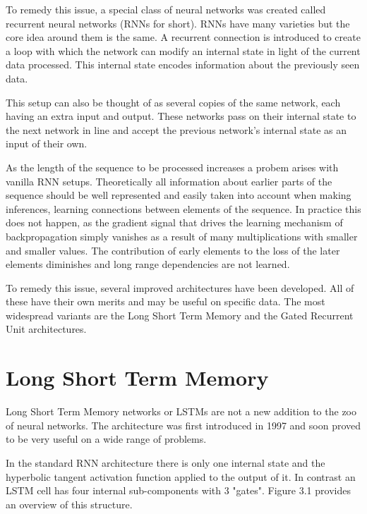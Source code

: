 \documentclass[bsc,frontabs,singlespacing,parskip,deptreport]{infthesis}
\begin{document}
To remedy this issue, a special class of neural networks was created called recurrent neural networks (RNNs for short). RNNs have many varieties but the core idea around them is the same. A recurrent connection is introduced to create a loop with which the network can modify an internal state in light of the current data processed. This internal state encodes information about the previously seen data. 

This setup can also be thought of as several copies of the same network, each having an extra input and output. These networks pass on their internal state to the next network in line and accept the previous network's internal state as an input of their own.

As the length of the sequence to be processed increases a probem arises with vanilla RNN setups. Theoretically all information about earlier parts of the sequence should be well represented and easily taken into account when making inferences, learning connections between elements of the sequence. In practice this does not happen, as the gradient signal that drives the learning mechanism of backpropagation simply vanishes as a result of many multiplications with smaller and smaller values. The contribution of early elements to the loss of the later elements diminishes and long range dependencies are not learned.

To remedy this issue, several improved architectures have been developed. All of these have their own merits and may be useful on specific data. The most widespread variants are the Long Short Term Memory and the Gated Recurrent Unit architectures.

\section{Long Short Term Memory}

Long Short Term Memory networks or LSTMs are not a new addition to the zoo of neural networks. The architecture was first introduced in 1997 \cite{lstm} and soon proved to be very useful on a wide range of problems.

In the standard RNN architecture there is only one internal state and the hyperbolic tangent activation function applied to the output of it. In contrast an LSTM cell has four internal sub-components with 3 "gates". Figure 3.1 provides an overview of this structure.
\end{document}
